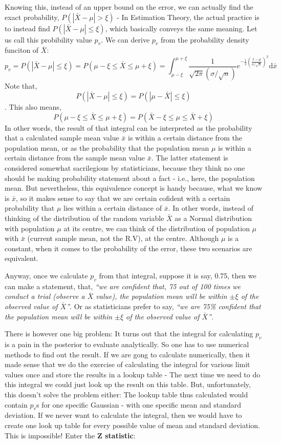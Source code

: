 Knowing this, instead of an upper bound on the error, we can actually find the exact probability, \( P(|\bar{X}-\mu| > \xi) \) - In Estimation Theory, the actual practice is to instead find \( P(|\bar{X}-\mu| \leq \xi) \), which basically conveys the same meaning. Let us call this probibility value \(p_v\). We can derive \(p_v\) from the probability density funciton of \(\bar{X}\):
	\[ p_v = P(|\bar{X}-\mu| \leq \xi)  = P(\mu-\xi \leq \bar{X} \leq \mu+\xi) =   \int_{\mu-\xi}^{\mu+\xi}  \frac{1}{\sqrt{2\pi}(\sigma/\sqrt{n})} e^{-\frac{1}{2}\left(\frac{\bar{x} - \mu}{\sigma/\sqrt{n}}\right)^2} \mathrm{d}\bar{x} \]
Note that, 
	\[ P(|\bar{X}-\mu| \leq \xi) =  P(|\mu-\bar{X}| \leq \xi) \]. 
This also means, 
	\[ P(\mu-\xi \leq \bar{X} \leq \mu+\xi) = P(\bar{X}-\xi \leq \mu \leq \bar{X}+\xi) \]
In other words, the result of that integral can be interpreted as the probability that a calculated sample mean value $\bar{x}$ is within a certain distance from the population mean, or as the probability that the population mean $\mu$ is within a certain distance from the sample mean value $\bar{x}$. The latter statement is considered somewhat sacrilegious by statisticians, because they think no one should be making probability statement about a fact - i.e., here, the population mean. But nevertheless, this equivalence concept is handy because, what we know is $\bar{x}$, so it makes sense to say that we are certain cofident with a certain probability that $\mu$ lies within a certain distance of $\bar{x}$. In other words, instead of thinking of the distribution of the random variable $\bar{X}$ as a Normal distribution with population $\mu$ at its centre, we can think of the distribution of population $\mu$ with $\bar{x}$ (current sample mean, not the R.V), at the centre. Although $\mu$ is a constant, when it comes to the probability of the error, these two scenarios are equivalent. 

Anyway, once we calculate \(p_v\) from that integral, suppose it is say, 0.75, then we can make a statement, that, \emph{``we are confident that, 75 out of 100 times we conduct a trial (observe a \(\bar{X}\) value), the population mean will be within \(\pm \xi\) of the observed value of \(\bar{X}\)''}. Or as statisticians prefer to say, \emph{``we are 75\% confident that the population mean will be within \(\pm \xi\) of the observed value of \(\bar{X}\)''}. 

There is however one big problem: It turns out that the integral for calculating \(p_v\) is a pain in the posterior to evaluate analytically. So one has to use numerical methods to find out the result. If we are gong to calculate numerically, then it made sense that we do the exercise of calculating the integral for various limit values once and store the results in a lookup table - The next time we need to do this integral we could just look up the result on this table. But, unfortunately, this doesn't solve the problem either: The lookup table thus calculated would contain \(p_v\)s for one specific Gaussian - with one specific mean and standard deviation. If we never want to calculate the integral, then we would have to create one look up table for every possible value of mean and standard deviation. This is impossible! Enter the \textbf{Z statistic}:

